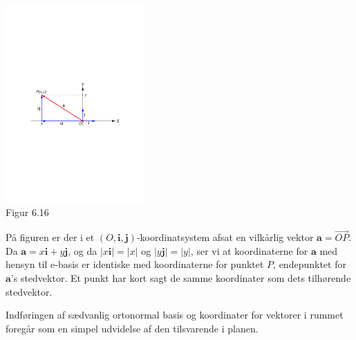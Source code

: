 \begin{remark}

\begin{center}
		\includegraphics[trim=4cm 11.2cm 3.8cm 11.6cm,width=0.4\textwidth,clip]{geometer/vektor10c.pdf}		
		\\Figur 6.16		
\end{center}
På figuren er der i et $(O,\mathbf i,\mathbf j)$-koordinatsystem afsat en vilkårlig vektor $\mathbf a =\stackrel{\rightarrow}{OP}$. Da $\mathbf a = x\mathbf i + y\mathbf j$, og da $|x\mathbf i|=|x|$ og $|y\mathbf j|=|y|$, ser vi at koordinaterne for $\mathbf a$ med hensyn til e-basis er identiske med koordinaterne for punktet $P$, endepunktet for $\mathbf a$'s stedvektor. Et punkt har kort sagt de samme koordinater som dets tilhørende stedvektor.
\end{remark}

Indføringen af sædvanlig ortonormal basis og koordinater for vektorer i rummet foregår som en simpel udvidelse af den tilsvarende i planen. 


